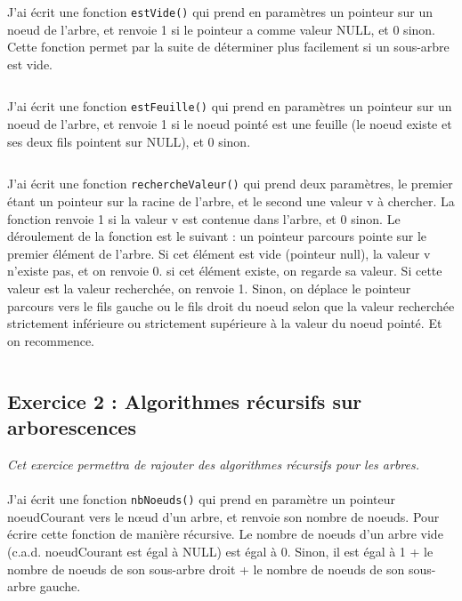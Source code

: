 J'ai écrit une fonction \texttt{estVide()} qui prend en paramètres un pointeur sur un noeud de l’arbre, et renvoie 1 si le pointeur a comme valeur NULL, et 0 sinon. Cette fonction permet par la suite de déterminer plus facilement si un sous-arbre est vide.
\inputminted[linenos,firstline=72,lastline=74]{cpp}{../sources/cpp/TP3-4/arbresBasiques.c}

J'ai écrit une fonction \texttt{estFeuille()} qui prend en paramètres un pointeur sur un noeud de l’arbre, et renvoie 1 si le noeud pointé est une feuille (le noeud existe et ses deux fils pointent sur NULL), et 0 sinon.
\inputminted[linenos,firstline=76,lastline=80]{cpp}{../sources/cpp/TP3-4/arbresBasiques.c}

J'ai écrit une fonction \texttt{rechercheValeur()} qui prend deux paramètres, le premier étant un pointeur sur la racine de l’arbre, et le second une valeur v à chercher. La fonction renvoie 1 si la valeur v est contenue dans l’arbre, et 0 sinon. Le déroulement de la fonction est le suivant : un pointeur parcours pointe sur le premier élément de l’arbre. Si cet élément est vide (pointeur null), la valeur v n’existe pas, et on renvoie 0. si cet élément existe, on regarde sa valeur. Si cette valeur est la valeur recherchée, on renvoie 1. Sinon, on déplace le pointeur parcours vers le fils gauche ou le fils droit du noeud selon que la valeur recherchée strictement inférieure ou strictement supérieure à la valeur du noeud pointé. Et on recommence.
\inputminted[linenos,firstline=82,lastline=95]{cpp}{../sources/cpp/TP3-4/arbresBasiques.c}

\subsection{Exercice 2 : Algorithmes récursifs sur arborescences}
\textit{Cet exercice permettra de rajouter des algorithmes récursifs pour les arbres.}
\\\\
J'ai écrit une fonction \texttt{nbNoeuds()} qui prend en paramètre un pointeur noeudCourant vers le nœud d’un arbre, et renvoie son nombre de noeuds. Pour écrire cette fonction de manière récursive. Le nombre de noeuds d’un arbre vide (c.a.d. noeudCourant est égal à NULL) est égal à 0. Sinon, il est égal à 1 + le nombre de noeuds de son sous-arbre droit + le nombre de noeuds de son sous-arbre gauche.
\inputminted[linenos,firstline=12,lastline=16]{cpp}{../sources/cpp/TP3-4/arbresFctRecursives.c}

